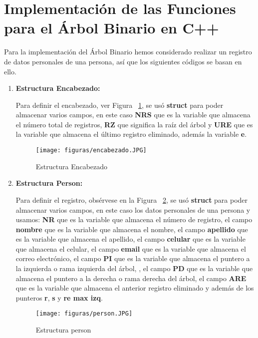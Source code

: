 \documentclass[10pt,conference]{IEEEtran}
\begin{document}
\section{\textbf{Implementación de las Funciones para el Árbol Binario en C++}} 
Para la implementación del Árbol Binario hemos considerado realizar un registro de datos personales de una persona, así que los siguientes códigos se basan en ello.
\begin{enumerate}[]
    \item {\textbf{Estructura Encabezado:}}
        \par Para definir el encabezado, ver Figura ~\ref{fencabeza}, se usó \textbf{struct} para poder almacenar varios campos, en este caso \textbf{NRS} que es la variable que almacena el número total de registros, \textbf{RZ} que significa la raíz del árbol y \textbf{URE} que es la variable que almacena el último registro eliminado, además la variable \textbf{e}.
        
        \begin{figure}[H]
            \begin{center}
            \texttt{[image: figuras/encabezado.JPG]}
            \caption{Estructura Encabezado}
            \label{fencabeza} 
            \end{center}
        \end{figure}
        
    \item {\textbf{Estructura Person:}}
        \par Para definir el registro, obsérvese en la Figura ~\ref{fperson}, se usó \textbf{struct} para poder almacenar varios campos, en este caso los datos personales de una persona y usamos: \textbf{NR} que es la variable que almacena el número de registro, el campo \textbf{nombre} que es la variable que almacena el nombre, el campo \textbf{apellido} que es la variable que almacena el apellido,  el campo \textbf{celular} que es la variable que almacena el celular, el campo \textbf{email} que es la variable que almacena el correo electrónico, el campo \textbf{PI} que es la variable que almacena el puntero a la izquierda o rama izquierda del árbol, , el campo \textbf{PD} que es la variable que almacena el puntero a la derecha o rama derecha del árbol, el campo \textbf{ARE} que es la variable que almacena el anterior registro eliminado y además de los punteros \textbf{r}, \textbf{s} y \textbf{re max izq}.
        
        \begin{figure}[H]
            \begin{center}
            \texttt{[image: figuras/person.JPG]}
            \caption{Estructura person}
             \label{fperson} 
             \end{center}
        \end{figure}
      

\end{enumerate}
\end{document}
